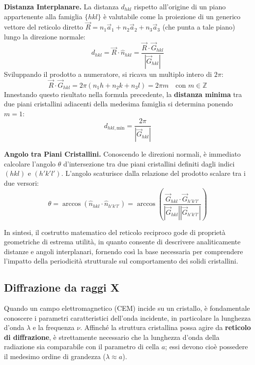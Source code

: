 \textbf{Distanza Interplanare.} La distanza \( d_{hkl} \) rispetto all'origine di un piano appartenente alla famiglia \( \{hkl\} \) è valutabile come la proiezione di un generico vettore del reticolo diretto \( \vec{R} = n_1\vec{a}_1 + n_2\vec{a}_2 + n_3\vec{a}_3 \) (che punta a tale piano) lungo la direzione normale:
\begin{equation}
    d_{hkl} = \vec{R} \cdot \hat{n}_{hkl} = \frac{\vec{R} \cdot \vec{G}_{hkl}}{|\vec{G}_{hkl}|}
\end{equation}
Sviluppando il prodotto a numeratore, si ricava un multiplo intero di \( 2\pi \):
\begin{equation}
    \vec{R} \cdot \vec{G}_{hkl} = 2\pi(n_1 h + n_2 k + n_3 l) = 2\pi m \quad \text{con } m \in \mathbb{Z}
\end{equation}
Innestando questo risultato nella formula precedente, la \textbf{distanza minima} tra due piani cristallini adiacenti della medesima famiglia si determina ponendo \( m = 1 \):
\begin{equation}
    d_{hkl,\text{min}} = \frac{2\pi}{|\vec{G}_{hkl}|}
\end{equation}

\textbf{Angolo tra Piani Cristallini.} Conoscendo le direzioni normali, è immediato calcolare l'angolo \( \theta \) d'intersezione tra due piani cristallini definiti dagli indici \( (hkl) \) e \( (h'k'l') \). L'angolo scaturisce dalla relazione del prodotto scalare tra i due versori:
\begin{equation}
    \theta = \arccos(\hat{n}_{hkl} \cdot \hat{n}_{h'k'l'}) = \arccos\left( \frac{\vec{G}_{hkl} \cdot \vec{G}_{h'k'l'}}{|\vec{G}_{hkl}| |\vec{G}_{h'k'l'}|} \right)
\end{equation}

In sintesi, il costrutto matematico del reticolo reciproco gode di proprietà geometriche di estrema utilità, in quanto consente di descrivere analiticamente distanze e angoli interplanari, fornendo così la base necessaria per comprendere l'impatto della periodicità strutturale sul comportamento dei solidi cristallini.

\subsection{Diffrazione da raggi X}
Quando un campo elettromagnetico (CEM) incide su un cristallo, è fondamentale conoscere i parametri caratteristici dell'onda incidente, in particolare la lunghezza d'onda \( \lambda \) e la frequenza \( \nu \). Affinché la struttura cristallina possa agire da \textbf{reticolo di diffrazione}, è strettamente necessario che la lunghezza d'onda della radiazione sia comparabile con il parametro di cella \( a \); essi devono cioè possedere il medesimo ordine di grandezza (\( \lambda \approx a \)). 

